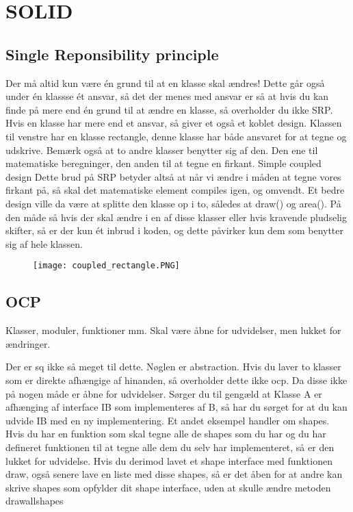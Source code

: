\documentclass[../SWD_disp.tex]{subfiles}
\begin{document}
\section{SOLID}
\subsection{Single Reponsibility principle}
Der må altid kun være én grund til at en klasse skal ændres!
Dette går også under én klassse ét ansvar, så det der menes med ansvar er så at hvis du kan finde på mere end én grund til at ændre en klasse, så overholder du ikke SRP. 
Hvis en klasse har mere end et ansvar, så giver et også et koblet design. Klassen til venstre har en klasse rectangle, denne klasse har både ansvaret for at tegne og udskrive. Bemærk også at to andre klasser benytter sig af den. Den ene til matematiske beregninger, den anden til at tegne en firkant.
Simple coupled design
Dette brud på SRP betyder altså at når vi ændre i måden at tegne vores firkant på, så skal det matematiske element compiles igen, og omvendt. 
Et bedre design ville da være at splitte den klasse op i to, således at draw() og area(). På den måde så hvis der skal ændre i en af disse klasser eller hvis kravende pludselig skifter, så er der kun ét inbrud i koden, og dette påvirker kun dem som benytter sig af hele klassen. 

\begin{figure}
    \texttt{[image: coupled\_rectangle.PNG]}
\end{figure}
\subsection{OCP}
Klasser, moduler, funktioner mm. Skal være åbne for udvidelser, men lukket for ændringer.

Der er sq ikke så meget til dette. Nøglen er abstraction. Hvis du laver to klasser som er direkte afhængige af hinanden, så overholder dette ikke ocp. Da disse ikke på nogen måde er åbne for udvidelser. Sørger du til gengæld at Klasse A er afhænging af interface IB som implementeres af B, så har du sørget for at du kan udvide IB med en ny implementering. 
Et andet eksempel handler om shapes. Hvis du har en funktion som skal tegne alle de shapes som du har og du har defineret funktionen til at tegne alle dem du selv har implementeret, så er den lukket for udvidelse. Hvis du derimod lavet et shape interface med funktionen draw, også senere lave en liste med disse shapes, så er det åben for at andre kan skrive shapes som opfylder dit shape interface, uden at skulle ændre metoden drawallshapes
\end{document}
